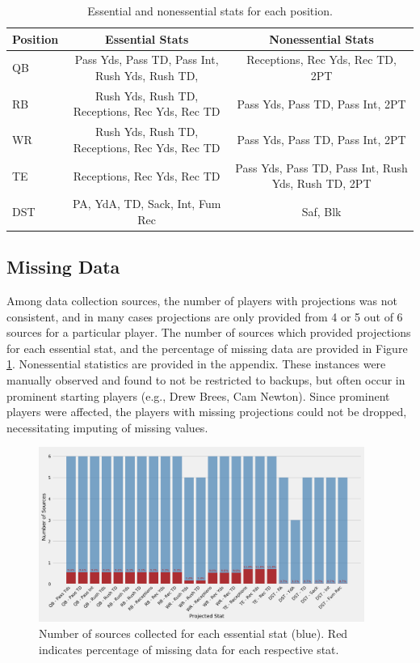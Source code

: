 \documentclass[12pt]{article}
\begin{document}
\begin{table}[H]
\caption{Essential and nonessential stats for each position.}
\small
\label{stats table}
\centering
\begin{adjustbox}{width =\textwidth}
\begin{tabular}{lcc}
	\toprule
	Position        &  Essential Stats            &  Nonessential Stats \\
	\midrule
	QB   &  Pass Yds, Pass TD, Pass Int, Rush Yds, Rush TD,   &   Receptions, Rec Yds, Rec TD, 2PT\\
	RB   &  Rush Yds, Rush TD, Receptions, Rec Yds, Rec TD   &   Pass Yds, Pass TD, Pass Int, 2PT \\
	WR   &  Rush Yds, Rush TD, Receptions, Rec Yds, Rec TD   &   Pass Yds, Pass TD, Pass Int, 2PT \\
	TE   &  Receptions, Rec Yds, Rec TD    &   Pass Yds, Pass TD, Pass Int, Rush Yds, Rush TD, 2PT\\
	DST  &  PA, YdA, TD, Sack, Int, Fum Rec & Saf, Blk \\
	\bottomrule
\end{tabular}
\end{adjustbox}
\end{table}


\subsection{Missing Data}

Among data collection sources, the number of players with projections was not consistent, and in many cases projections are only provided from 4 or 5 out of 6 sources for a particular player. The number of sources which provided projections for each essential stat, and the percentage of missing data are provided in Figure \ref{missing data}. Nonessential statistics are provided in the appendix. These instances were manually observed and found to not be restricted to backups, but often occur in prominent starting players (e.g., Drew Brees, Cam Newton). Since prominent players were affected, the players with missing projections could not be dropped, necessitating imputing of missing values.\bigskip


\begin{figure}[H]
  \centering
  \includegraphics[width=0.95\textwidth]{../figures/missing_data}
  \caption{Number of sources collected for each essential stat (blue). Red indicates percentage of missing data for each respective stat.}
  \label{missing data}
\end{figure}
\end{document}

